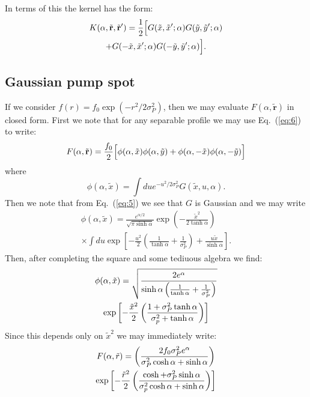 \documentclass[twocolumn]{revtex4-1}
\renewcommand{\vec}[1]{\mathbf{#1}}
\newcommand{\tvr}{\tilde{\vec{r}}}
\newcommand{\tvrp}{\tilde{\vec{r}}^\prime}
\begin{document}
In terms of this the kernel has the form:
\begin{multline}
  \label{eq:6}
  K(\alpha, \tvr, \tvrp)
  =
  \frac{1}{2} \Bigl[
    G(\tilde{x}, \tilde{x}^\prime; \alpha)
    G(\tilde{y}, \tilde{y}^\prime; \alpha)
    \\+
    G(-\tilde{x}, \tilde{x}^\prime; \alpha)
    G(-\tilde{y}, \tilde{y}^\prime; \alpha)
  \Bigr].
\end{multline}


\subsection{Gaussian pump spot}
\label{sec:gaussian-pump-spot}

If we consider $f(r) = f_0 \exp(-r^2/2\sigma_P^2)$, then we may evaluate
$F(\alpha, \tvr)$ in closed form.  First we note that for
any separable profile we may use Eq.~(\ref{eq:6}) to write:
\begin{equation}
  F(\alpha, \tvr) 
  =
  \frac{f_0}{2} \Bigl[
    \phi(\alpha, \tilde{x}) 
    \phi(\alpha, \tilde{y}) 
    +
    \phi(\alpha, -\tilde{x}) 
    \phi(\alpha, -\tilde{y}) 
  \Bigr]
\end{equation}
where 
\begin{displaymath}
  \phi(\alpha, \tilde{x})
  =
  \int du e^{-u^2/2\sigma_P^2}
  G(\tilde{x}, u, \alpha).
\end{displaymath}
Then we note that from Eq.~(\ref{eq:5}) we see that $G$ is Gaussian
and we may write
\begin{multline}
  \phi(\alpha, \tilde{x})
  = \frac{e^{\alpha/2}}{\sqrt{\pi \sinh \alpha}}
  \exp\left(    - \frac{\tilde{x}^2}{2\tanh \alpha}\right)
  \\\times
  \int du \exp\left[
    - \frac{u^2}{2} \left(\frac{1}{\tanh \alpha}+\frac{1}{\sigma_P^2}\right)
    + \frac{u \tilde{x}}{\sinh\alpha}
  \right].  
\end{multline}
Then, after completing the square and some tediuous algebra we find:
\begin{multline}
  \phi(\alpha, \tilde{x})
  =
  \sqrt{\frac{2e^\alpha}{%
      \sinh\alpha\left(\frac{1}{\tanh \alpha}+\frac{1}{\sigma_P^2}\right)}}
  \\
  \exp\left[
    - \frac{\tilde{x}^2}{2}
    \left(
      \frac{ 1 + \sigma_P^2 \tanh\alpha}{\sigma_p^2 + \tanh\alpha} 
    \right)
  \right]
\end{multline}
Since this depends only on $\tilde{x}^2$ we may immediately write:
\begin{multline}
  \label{eq:7}
  F(\alpha, \tilde{r}) =
  \left(\frac{2  f_0 \sigma_P^2 e^\alpha}{%
    \sigma_P^2 \cosh\alpha + \sinh\alpha }\right)
  \\
  \exp\left[
    - \frac{\tilde{r}^2}{2}
    \left(
      \frac{ \cosh + \sigma_P^2 \sinh\alpha}{\sigma_p^2\cosh\alpha + \sinh\alpha} 
    \right)
  \right]
\end{multline}
\end{document}
